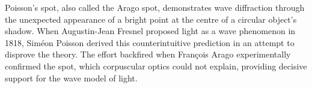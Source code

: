 Poisson’s spot, also called the Arago spot, demonstrates wave diffraction through the unexpected appearance of a bright point at the centre of a circular object’s shadow. When Augustin-Jean Fresnel proposed light as a wave phenomenon in 1818, Siméon Poisson derived this counterintuitive prediction in an attempt to disprove the theory. The effort backfired when François Arago experimentally confirmed the spot, which corpuscular optics could not explain, providing decisive support for the wave model of light.